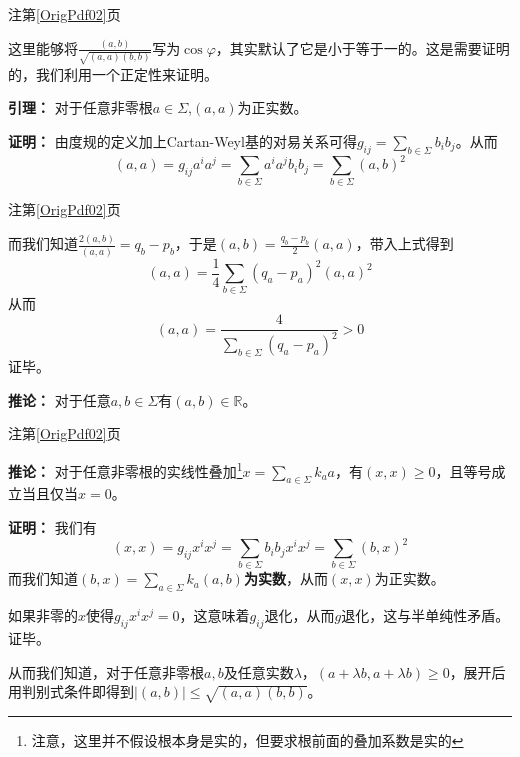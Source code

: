 \documentclass{beamer}
\newcommand{\refpage}[1]{注第\ref{OrigPdf#1}页}%
\begin{document}
\begin{frame}{\refpage{02}}
	
	这里能够将$\frac{(a,b)}{\sqrt{(a,a)(b,b)}}$写为$\cos\varphi$，其实默认了它是小于等于一的。这是需要证明的，我们利用一个正定性来证明。
	
	\textbf{引理：} 对于任意非零根$a\in\Sigma$,$(a,a)$为正实数。

	\textbf{证明：} 由度规的定义加上Cartan-Weyl基的对易关系可得$g_{ij}=\sum_{b\in\Sigma} b_ib_j$。从而
	\begin{equation*}
	(a,a)=g_{ij}a^ia^j=\sum_{b\in\Sigma} a^ia^jb_ib_j=\sum_{b\in\Sigma}(a,b)^2
	\end{equation*}
	
\end{frame}

\begin{frame}{\refpage{02}}

而我们知道$\frac{2(a,b)}{(a,a)}=q_b-p_b$，于是$(a,b)=\frac{q_b-p_b}{2}(a,a)$，带入上式得到
\begin{equation*}
(a,a)=\frac{1}{4}\sum_{b\in\Sigma}(q_a-p_a)^2(a,a)^2
\end{equation*}
从而
\begin{equation*}
(a,a)=\frac{4}{\sum_{b\in\Sigma}(q_a-p_a)^2}>0
\end{equation*}
证毕。

\textbf{推论：} 对于任意$a,b\in\Sigma$有$(a,b)\in\mathbb R$。

\end{frame}

\begin{frame}{\refpage{02}}
	
	\textbf{推论：} 对于任意非零根的实线性叠加\footnote{注意，这里并不假设根本身是实的，但要求根前面的叠加系数是实的}$x=\sum_{a\in\Sigma}k_aa$，有$(x,x)\geq 0$，且等号成立当且仅当$x=0$。
	
	\textbf{证明：} 我们有
	\begin{equation*}
	(x,x)=g_{ij}x^ix^j=\sum_{b\in\Sigma} b_ib_jx^ix^j=\sum_{b\in\Sigma} (b,x)^2
	\end{equation*}
	而我们知道$(b,x)=\sum_{a\in\Sigma} k_a(a,b)$\textbf{为实数}，从而$(x,x)$为正实数。
	
	如果非零的$x$使得$g_{ij}x^ix^j=0$，这意味着$g_{ij}$退化，从而$g$退化，这与半单纯性矛盾。证毕。
	
	从而我们知道，对于任意非零根$a,b$及任意实数$\lambda$，$(a+\lambda b,a+\lambda b)\geq 0$，展开后用判别式条件即得到$|(a,b)|\leq \sqrt{(a,a)(b,b)}$。
	
\end{frame}
\end{document}
